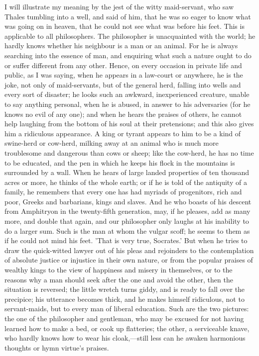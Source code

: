 \documentclass[11pt,letter]{article}
\begin{document}
\par  I will illustrate my meaning by the jest of the witty maid-servant, who saw Thales tumbling into a well, and said of him, that he was so eager to know what was going on in heaven, that he could not see what was before his feet. This is applicable to all philosophers. The philosopher is unacquainted with the world; he hardly knows whether his neighbour is a man or an animal. For he is always searching into the essence of man, and enquiring what such a nature ought to do or suffer different from any other. Hence, on every occasion in private life and public, as I was saying, when he appears in a law-court or anywhere, he is the joke, not only of maid-servants, but of the general herd, falling into wells and every sort of disaster; he looks such an awkward, inexperienced creature, unable to say anything personal, when he is abused, in answer to his adversaries (for he knows no evil of any one); and when he hears the praises of others, he cannot help laughing from the bottom of his soul at their pretensions; and this also gives him a ridiculous appearance. A king or tyrant appears to him to be a kind of swine-herd or cow-herd, milking away at an animal who is much more troublesome and dangerous than cows or sheep; like the cow-herd, he has no time to be educated, and the pen in which he keeps his flock in the mountains is surrounded by a wall. When he hears of large landed properties of ten thousand acres or more, he thinks of the whole earth; or if he is told of the antiquity of a family, he remembers that every one has had myriads of progenitors, rich and poor, Greeks and barbarians, kings and slaves. And he who boasts of his descent from Amphitryon in the twenty-fifth generation, may, if he pleases, add as many more, and double that again, and our philosopher only laughs at his inability to do a larger sum. Such is the man at whom the vulgar scoff; he seems to them as if he could not mind his feet. 'That is very true, Socrates.' But when he tries to draw the quick-witted lawyer out of his pleas and rejoinders to the contemplation of absolute justice or injustice in their own nature, or from the popular praises of wealthy kings to the view of happiness and misery in themselves, or to the reasons why a man should seek after the one and avoid the other, then the situation is reversed; the little wretch turns giddy, and is ready to fall over the precipice; his utterance becomes thick, and he makes himself ridiculous, not to servant-maids, but to every man of liberal education. Such are the two pictures: the one of the philosopher and gentleman, who may be excused for not having learned how to make a bed, or cook up flatteries; the other, a serviceable knave, who hardly knows how to wear his cloak,—still less can he awaken harmonious thoughts or hymn virtue's praises.
\end{document}
